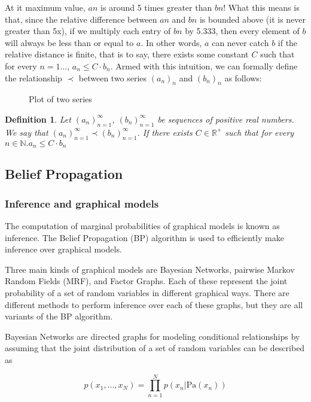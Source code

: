 \documentclass[11pt]{article}
\newtheorem{definition}{Definition}
\begin{document}
At it maximum value, $an$ is around 5 times greater than $bn$! What this means is that, since the relative difference between $an$ and $bn$ is bounded above (it is never greater than 5x), if we multiply each entry of $bn$ by 5.333, then every element of $b$ will always be less than or equal to $a$. In other words, $a$ can never catch $b$ if the relative distance is finite, that is to say, there exists some constant $C$ such that for every $n=1\ldots$, $a_n \leq C \cdot b_n$. Armed with this intuition, we can formally define the relationship $\prec$ between two series $(a_n)_n$ and $(b_n)_n$ as follows:


\begin{figure*}[h!]
	\centering
	\scalebox{0.5}{}
	\caption{Plot of two series}
	\label{fig:growth-2}
\end{figure*}


\begin{definition}
	Let $(a_n)_{n=1}^\infty$, $(b_n)_{n=1}^\infty$ be sequences of positive real numbers. We say that $(a_n)_{n=1}^\infty \prec (b_n)_{n=1}^\infty$. If there exists $C\in\mathbb{R}^{+}$ such that for every $n\in\mathbb{N}. a_n \leq C\cdot b_n$
\end{definition}

\subsection*{Belief Propagation}
\subsubsection*{Inference and graphical models}
The computation of marginal probabilities of graphical models is known as inference. The Belief Propagation (BP) algorithm is used to efficiently make inference over graphical models.

Three main kinds of graphical models are Bayesian Networks, pairwise Markov Random Fields (MRF), and Factor Graphs. Each of these represent the joint probability of a set of random variables in different graphical ways. There are different methods to perform inference over each of these graphs, but they are all variants of the BP algorithm.


Bayesian Networks are directed graphs for modeling conditional relationships by assuming that the joint distribution of a set of random variables can be described as

\begin{equation*}
	p(x_1, \ldots, x_N) = \prod_{n=1}^Np(x_n\vert \text{Pa}(x_n))
\end{equation*}
\end{document}
